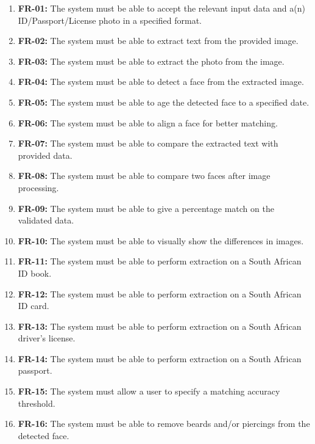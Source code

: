 \documentclass{article}
\begin{document}
		\begin{enumerate}
		    \item \textbf{FR-01:} The system must be able to accept the relevant input data and a(n) ID/Passport/License photo in a specified format.
		    \item \textbf{FR-02:} The system must be able to extract text from the provided image.
		    \item \textbf{FR-03:} The system must be able to extract the photo from the image.
		    \item \textbf{FR-04:} The system must be able to detect a face from the extracted image.
		    \item \textbf{FR-05:} The system must be able to age the detected face to a specified date.
		    \item \textbf{FR-06:} The system must be able to align a face for better matching.
		    \item \textbf{FR-07:} The system must be able to compare the extracted text with provided data.
		    \item \textbf{FR-08:} The system must be able to compare two faces after image processing.
		    \item \textbf{FR-09:} The system must be able to give a percentage match on the validated data.
		    \item \textbf{FR-10:} The system must be able to visually show the differences in images.
		    \item \textbf{FR-11:} The system must be able to perform extraction on a South African ID book.
		    \item \textbf{FR-12:} The system must be able to perform extraction on a South African ID card.
		    \item \textbf{FR-13:} The system must be able to perform extraction on a South African driver's license.
		    \item \textbf{FR-14:} The system must be able to perform extraction on a South African passport.
		    \item \textbf{FR-15:} The system must allow a user to specify a matching accuracy threshold.
		    \item \textbf{FR-16:} The system must be able to remove beards and/or piercings from the detected face.
		    
		\end{enumerate}
		
\end{document}
